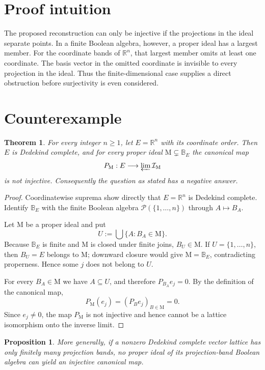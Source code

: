 \documentclass[11pt]{article}
\newtheorem{theorem}{Theorem}
\newtheorem{proposition}{Proposition}
\newcommand{\BE}{\mathbb B_E}
\newcommand{\PM}{P_{\mathrm M}}
\begin{document}
\section{Proof intuition}

The proposed reconstruction can only be injective if the projections in the
ideal separate points.  In a finite Boolean algebra, however, a proper ideal
has a largest member.  For the coordinate bands of $\mathbb R^n$, that largest
member omits at least one coordinate.  The basis vector in the omitted
coordinate is invisible to every projection in the ideal.  Thus the
finite-dimensional case supplies a direct obstruction before surjectivity is
even considered.

\section{Counterexample}

\begin{theorem}
For every integer $n\geq1$, let $E=\mathbb R^n$ with its coordinate order.
Then $E$ is Dedekind complete, and for every proper ideal
$\mathrm M\subsetneq\BE$ the canonical map
\[
 \PM:E\longrightarrow\varprojlim\mathcal I_{\mathrm M}
\]
is not injective.  Consequently the question as stated has a negative answer.
\end{theorem}

\begin{proof}
Coordinatewise suprema show directly that $E=\mathbb R^n$ is Dedekind
complete.  Identify $\BE$ with the finite Boolean algebra
$\mathcal P(\{1,\dots,n\})$ through $A\mapsto B_A$.

Let $\mathrm M$ be a proper ideal and put
\[
 U:=\bigcup\{A:B_A\in\mathrm M\}.
\]
Because $\BE$ is finite and $\mathrm M$ is closed under finite joins,
$B_U\in\mathrm M$.  If $U=\{1,\dots,n\}$, then $B_U=E$ belongs to
$\mathrm M$; downward closure would give $\mathrm M=\BE$, contradicting
properness.  Hence some $j$ does not belong to $U$.

For every $B_A\in\mathrm M$ we have $A\subseteq U$, and therefore
$P_{B_A}e_j=0$.  By the definition of the canonical map,
\[
 \PM(e_j)=(P_Be_j)_{B\in\mathrm M}=0.
\]
Since $e_j\neq0$, the map $\PM$ is not injective and hence cannot be a lattice
isomorphism onto the inverse limit.
\end{proof}

\begin{proposition}
More generally, if a nonzero Dedekind complete vector lattice has only
finitely many projection bands, no proper ideal of its projection-band Boolean
algebra can yield an injective canonical map.
\end{proposition}
\end{document}
